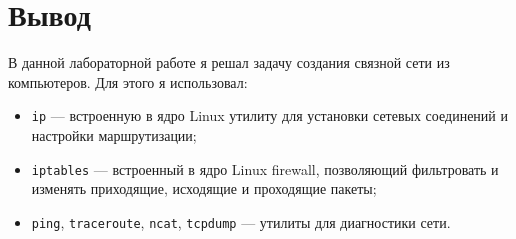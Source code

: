 \section{Вывод}
В данной лабораторной работе я решал задачу создания связной сети из компьютеров.
Для этого я использовал:
\begin{itemize}
    \item \texttt{ip} --- встроенную в ядро Linux утилиту для установки сетевых соединений и настройки маршрутизации;
    \item \texttt{iptables} --- встроенный в ядро Linux firewall, позволяющий фильтровать и изменять приходящие,
    исходящие и проходящие пакеты;
    \item \texttt{ping}, \texttt{traceroute}, \texttt{ncat}, \texttt{tcpdump}
    --- утилиты для диагностики сети.
\end{itemize}
